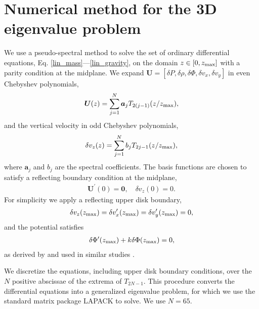 \section{Numerical method for the 3D eigenvalue problem}\label{3d_method}
We use a pseudo-spectral method to solve the set of ordinary
differential equations, Eq. \ref{lin_mass}---\ref{lin_gravity}, on 
the domain $ z\in[0,z_\mathrm{max}]$ with a parity condition at the midplane.
We expand $\bm{U}=[\delta P,\delta\rho,\delta\Phi,
  \delta v_x, \delta 
  v_y]$ in even Chebyshev polynomials,
\begin{align}
  \bm{U}(z) = \sum_{j=1}^N \bm{a}_jT_{2(j-1)}(z/z_\mathrm{max}), 
\end{align}
and the vertical velocity in odd Chebyshev polynomials,
\begin{align}
  \delta v_z(z) = \sum_{j=1}^N b_jT_{2j-1}(z/z_\mathrm{max}),   
\end{align}
where $\bm{a}_j$ and $b_j$ are the spectral coefficients. 
The basis functions are chosen to satisfy a reflecting boundary
condition at the midplane, %
\begin{align}
  \bm{U}^\prime(0) = \bm{0}, \quad \delta v_z(0) = 0.
\end{align}
For simplicity we apply a reflecting upper disk boundary, %
\begin{align}
  \delta v_z(z_\mathrm{max}) = \delta v_x^\prime(z_\mathrm{max}) = \delta
  v_y^\prime(z_\mathrm{max}) = 0,
\end{align}
and the potential satisfies
\begin{align}
  \delta \Phi^\prime (z_\mathrm{max}) + k \delta\Phi(z_\mathrm{max}) = 0, 
\end{align}
as derived by \cite{goldreich65a} and used in similar studies  
\citep{kim12,lin14c}. %

We discretize the equations, including upper disk boundary conditions,
over the $N$ positive abscissae of the extrema of $T_{2N-1}$. This
procedure converts the differential equations into a generalized
eigenvalue problem, for which we use the standard matrix package
LAPACK to solve. We use $N=65$. 
